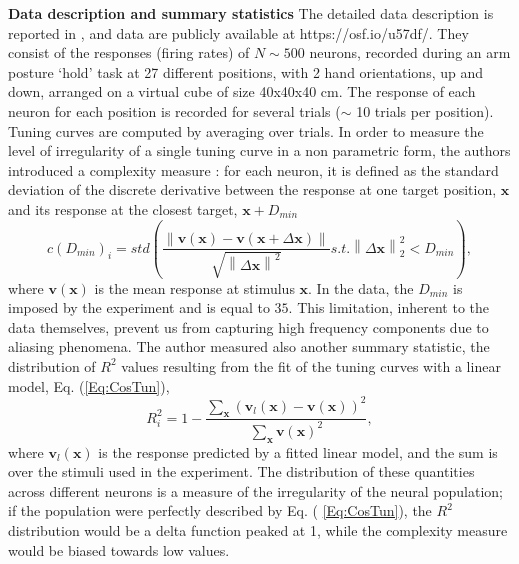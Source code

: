 \documentclass[a4paper]{article}%
\begin{document}
\textbf{Data description and summary statistics} The detailed data description
is reported in \cite{Lalazar2016TuningConnectivity}, and data are publicly
available at https://osf.io/u57df/. They consist of the responses (firing
rates) of $N \sim500$ neurons, recorded during an arm posture `hold' task at
27 different positions, with 2 hand orientations, up and down, arranged on
a virtual cube of size 40x40x40 cm. The response of each neuron for each
position is recorded for several trials ($\sim$ 10 trials per position).
Tuning curves are computed by averaging over trials. In order to measure the
level of irregularity of a single tuning curve in a non parametric form, the
authors introduced a complexity measure : for each neuron, it is defined as the
standard deviation of the discrete derivative between the response at one
target position, $\mathbf{x}$ and its response at the closest target, $\mathbf{x} +D_{min}$
\begin{equation}
c(D_{min})_{i} = std\left(  \frac{\left\|  \mathbf{v}(\mathbf{x}) - \mathbf{v}(\mathbf{x}+\Delta \mathbf{x})\right\|  }
{\sqrt{\left\|  \Delta \mathbf{x}\right\|  ^{2}}} s.t. \left\|  \Delta \mathbf{x}\right\|
_{2}^{2} < D_{min}\right)  ,
\end{equation}
where $\mathbf{v}(\mathbf{x})$ is the mean response at stimulus $\mathbf{x}$. In the
data, the $D_{min}$ is imposed by the experiment and is equal to $35$. This
limitation, inherent to the data themselves, prevent us from capturing high
frequency components due to aliasing phenomena. The author measured also
another summary statistic, the distribution of $R^{2}$ values resulting from
the fit of the tuning curves with a linear model, Eq. (\ref{Eq:CosTun}),
\begin{equation}
R^{2}_{i} = 1-\frac{\sum_{\mathbf{x}}\left(
\mathbf{v}_{l}(\mathbf{x}) - \mathbf{v}(\mathbf{x})\right)  ^{2}}{\sum_{\mathbf{x}}
\mathbf{v}(\mathbf{x})^{2}},
\end{equation}
where $\mathbf{v}_{l}(\mathbf{x})$ is the response predicted by a fitted linear model,
and the sum is over the stimuli used in the experiment. The distribution of
these quantities across different neurons is a measure of the irregularity of
the neural population; if the population were perfectly described
by Eq. ( \ref{Eq:CosTun}), the $R^{2}$ distribution would be a delta
function peaked at 1, while the complexity measure would be biased
towards low values.
\end{document}

